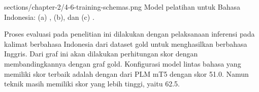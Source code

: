   {sections/chapter-2/4-6-training-schemas.png}
  {Model pelatihan \crosslingual{} untuk Bahasa Indonesia: (a) , (b), dan (c)  .}

Proses evaluasi pada penelitian ini dilakukan dengan pelaksanaan inferensi pada kalimat berbahasa Indonesia dari dataset gold untuk menghasilkan \AMR{} berbahasa Inggris.
Dari graf \AMR{} ini akan dilakukan perhitungan skor \SMATCH{} dengan membandingkannya dengan graf \AMR{} gold.
Konfigurasi model \amrparsing{} lintas bahasa yang memiliki skor \SMATCH{} terbaik adalah dengan \mwordem{} dari \gls{PLM} mT5 dengan skor \SMATCH{} 51.0.
Namun teknik   masih memiliki skor \SMATCH{} yang lebih tinggi, yaitu 62.5.
